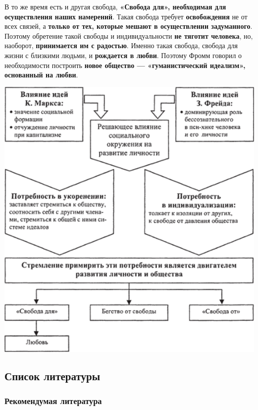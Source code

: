 \documentclass{article}
\begin{document}
\begin{flushleft}
\hfill

В то же время есть и другая свобода, \textbf{«Свобода для», необходимая для осуществления наших намерений}. Такая свобода требует \textbf{освобождения} не от всех связей, а \textbf{только от тех, которые мешают в осуществлении задуманного}. Поэтому обретение такой свободы и индивидуальности \textbf{не тяготит человека}, но, наоборот, \textbf{принимается им с радостью}. Именно такая свобода, свобода для жизни с близкими людьми, и \textbf{рождается в любви}. Поэтому Фромм говорил о необходимости построить \textbf{новое общество — «гуманистический идеализм», основанный на любви}.

\hfill

\includegraphics[width=\textwidth]{erich_fromm}

\end{flushleft}

\subsection{Список литературы}

\subsubsection{Рекомендумая литература}
\end{document}

